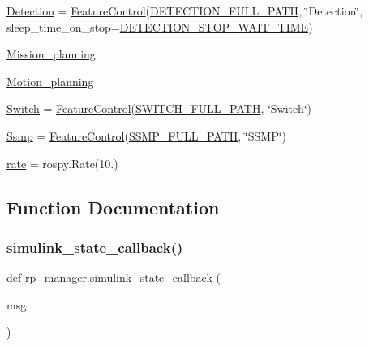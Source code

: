 \begin{DoxyCompactItemize}
\item 
\hyperlink{namespacerp__manager_a48713c04a94d14edf4a48051376c73ca}{Detection} = \hyperlink{classFeatureControl_1_1FeatureControl}{Feature\+Control}(\hyperlink{namespacerp__manager_a70fad5203ba45cd0085ee33158b164be}{D\+E\+T\+E\+C\+T\+I\+O\+N\+\_\+\+F\+U\+L\+L\+\_\+\+P\+A\+TH}, \char`\"{}Detection\char`\"{}, sleep\+\_\+time\+\_\+on\+\_\+stop=\hyperlink{namespacerp__manager_a2a1de6661f1541719bab9d3d2e7661a1}{D\+E\+T\+E\+C\+T\+I\+O\+N\+\_\+\+S\+T\+O\+P\+\_\+\+W\+A\+I\+T\+\_\+\+T\+I\+ME})
\item 
\hyperlink{namespacerp__manager_a13a981f0dfd4007cc0341452cc0696ee}{Mission\+\_\+planning}
\item 
\hyperlink{namespacerp__manager_a1ea58b084aa5c6382085b94b09a107f5}{Motion\+\_\+planning}
\item 
\hyperlink{namespacerp__manager_ae41df772e3f2842aea416ed2b6f26ec0}{Switch} = \hyperlink{classFeatureControl_1_1FeatureControl}{Feature\+Control}(\hyperlink{namespacerp__manager_a98789269c0bde80d85d5c62af5133062}{S\+W\+I\+T\+C\+H\+\_\+\+F\+U\+L\+L\+\_\+\+P\+A\+TH}, \char`\"{}Switch\char`\"{})
\item 
\hyperlink{namespacerp__manager_a526a1df0e334b5e0026a6d4f4d851195}{Ssmp} = \hyperlink{classFeatureControl_1_1FeatureControl}{Feature\+Control}(\hyperlink{namespacerp__manager_aa5f54d7effc05602e428d9d5829184c9}{S\+S\+M\+P\+\_\+\+F\+U\+L\+L\+\_\+\+P\+A\+TH}, \char`\"{}S\+S\+MP\char`\"{})
\item 
\hyperlink{namespacerp__manager_a356ae7e0a3da8c3f6d968b297f09cf8a}{rate} = rospy.\+Rate(10.)
\end{DoxyCompactItemize}


\subsection{Function Documentation}
\mbox{\label{namespacerp__manager_a12d1e048fb6f0fcabb8e81c26f042ed5}} 
\subsubsection{\texorpdfstring{simulink\+\_\+state\+\_\+callback()}{simulink\_state\_callback()}}
{\footnotesize\ttfamily def rp\+\_\+manager.\+simulink\+\_\+state\+\_\+callback (\begin{DoxyParamCaption}\item[{}]{msg }\end{DoxyParamCaption})}



